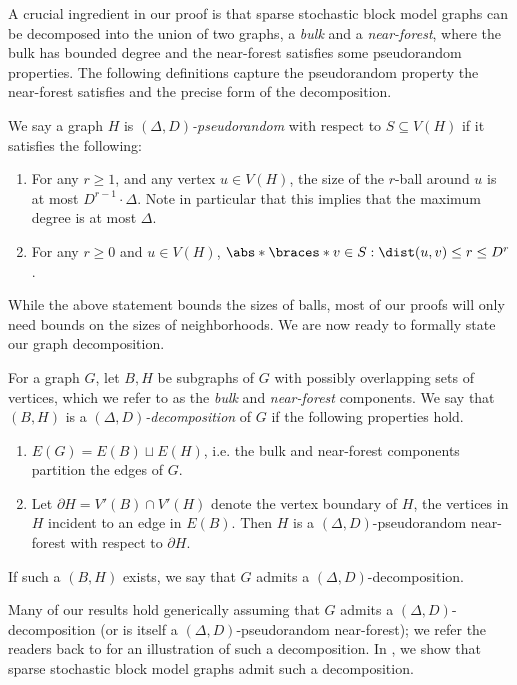 \documentclass[11pt,letterpaper]{article}
\begin{document}
    A crucial ingredient in our proof is that sparse stochastic block model graphs can be decomposed into the union of two graphs, a \emph{bulk} and a \emph{near-forest}, where the bulk has bounded degree and the near-forest satisfies some pseudorandom properties.
    The following definitions capture the pseudorandom property the near-forest satisfies and the precise form of the decomposition.
    \begin{definition}\label{def:pseudorandom-graph}
        We say a graph $H$ is \emph{$(\Delta,D)$-pseudorandom} with respect to $S \subseteq V(H)$ if it satisfies the following:
        \begin{enumerate}
            \item For any $r\ge 1$, and any vertex $u\in V(H)$, the size of the $r$-ball around $u$ is at most $D^{r-1}\cdot\Delta$. Note in particular that this implies that the maximum degree is at most $\Delta$.
            \item For any $r\ge 0$ and $u\in V(H)$, $\abs*{\braces*{v\in S: \dist(u,v)\le r}} \le D^r$. 
        \end{enumerate}
    \end{definition}
    While the above statement bounds the sizes of balls, most of our proofs will only need bounds on the sizes of neighborhoods. We are now ready to formally state our graph decomposition.
    \begin{definition}
        For a graph $G$, let $B, H$ be subgraphs of $G$ with possibly overlapping sets of vertices, which we refer to as the \emph{bulk} and \emph{near-forest} components.
        We say that $(B, H)$ is a \emph{$(\Delta, D)$-decomposition} of $G$ if the following properties hold.
        \begin{enumerate}
            \item $E(G) = E(B) \sqcup E(H)$, i.e. the bulk and near-forest components partition the edges of $G$. 
            \item Let $\partial H = V'(B) \cap V'(H)$ denote the vertex boundary of $H$, the vertices in $H$ incident to an edge in $E(B)$. Then $H$ is a $(\Delta, D)$-pseudorandom near-forest with respect to $\partial H$.
        \end{enumerate}

        If such a $(B, H)$ exists, we say that $G$ admits a $(\Delta, D)$-decomposition.
    \end{definition}
    
    Many of our results hold generically assuming that $G$ admits a $(\Delta, D)$-decomposition (or is itself a $(\Delta, D)$-pseudorandom near-forest);  we refer the readers back to  for an illustration of such a decomposition. In , we show that sparse stochastic block model graphs admit such a decomposition.
\end{document}
